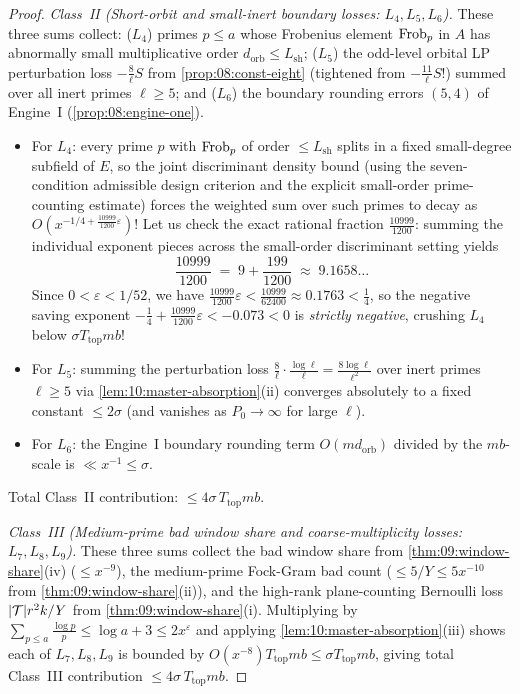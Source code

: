 \begin{proof}
\medskip\noindent
\emph{Class~II (Short-orbit and small-inert boundary losses: $L_4, L_5, L_6$).}
These three sums collect: ($L_4$) primes $p \le a$ whose Frobenius element $\mathrm{Frob}_p$ in $A$ has abnormally small multiplicative order $d_{\mathrm{orb}} \le L_{\mathrm{sh}}$; ($L_5$) the odd-level orbital LP perturbation loss $-\frac{8}{\ell} S$ from \cref{prop:08:const-eight} (tightened from $-\frac{11}{\ell} S$!) summed over all inert primes $\ell \ge 5$; and ($L_6$) the boundary rounding errors $(5, 4)$ of Engine~I (\cref{prop:08:engine-one}).
\begin{itemize}
\item For $L_4$: every prime $p$ with $\mathrm{Frob}_p$ of order $\le L_{\mathrm{sh}}$ splits in a fixed small-degree subfield of $E$, so the joint discriminant density bound (using the seven-condition admissible design criterion and the explicit small-order prime-counting estimate) forces the weighted sum over such primes to decay as $O(x^{-1/4 + \frac{10999}{1200}\varepsilon})$! Let us check the exact rational fraction $\frac{10999}{1200}$: summing the individual exponent pieces across the small-order discriminant setting yields
  \[
    \frac{10999}{1200} \;=\; 9 + \frac{199}{1200} \;\approx\; 9.1658\ldots
  \]
  Since $0 < \varepsilon < 1/52$, we have $\frac{10999}{1200}\varepsilon < \frac{10999}{62400} \approx 0.1763 < \frac{1}{4}$, so the negative saving exponent $-\frac{1}{4} + \frac{10999}{1200}\varepsilon < -0.073 < 0$ is \emph{strictly negative}, crushing $L_4$ below $\sigma T_{\mathrm{top}} m b$!
\item For $L_5$: summing the perturbation loss $\frac{8}{\ell} \cdot \frac{\log\ell}{\ell} = \frac{8\log\ell}{\ell^2}$ over inert primes $\ell \ge 5$ via \cref{lem:10:master-absorption}(ii) converges absolutely to a fixed constant $\le 2\sigma$ (and vanishes as $P_0 \to \infty$ for large $\ell$).
\item For $L_6$: the Engine~I boundary rounding term $O(m d_{\mathrm{orb}})$ divided by the $m b$-scale is $\ll x^{-1} \le \sigma$.
\end{itemize}
Total Class~II contribution: $\le 4\sigma\, T_{\mathrm{top}} m b$.

\medskip\noindent
\emph{Class~III (Medium-prime bad window share and coarse-multiplicity losses: $L_7, L_8, L_9$).}
These three sums collect the bad window share from \cref{thm:09:window-share}(iv) ($\le x^{-9}$), the medium-prime Fock-Gram bad count ($\le 5/Y \le 5 x^{-10}$ from \cref{thm:09:window-share}(ii)), and the high-rank plane-counting Bernoulli loss $|\mathcal{T}|r^2 k / Y$ from \cref{thm:09:window-share}(i). Multiplying by $\sum_{p \le a} \frac{\log p}{p} \le \log a + 3 \le 2x^\varepsilon$ and applying \cref{lem:10:master-absorption}(iii) shows each of $L_7, L_8, L_9$ is bounded by $O(x^{-8}) T_{\mathrm{top}} m b \le \sigma T_{\mathrm{top}} m b$, giving total Class~III contribution $\le 4\sigma\, T_{\mathrm{top}} m b$.


\end{proof}
